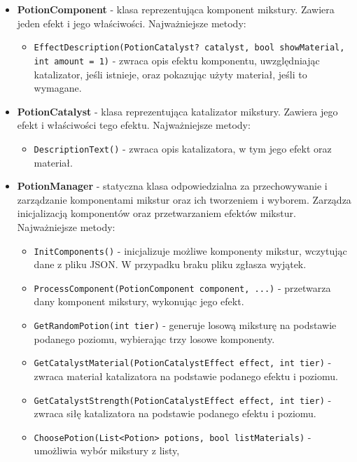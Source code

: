\begin{itemize}
        \item \textbf{PotionComponent} - klasa reprezentująca komponent mikstury. 
        Zawiera jeden efekt i jego właściwości. Najważniejsze metody:
            \begin{itemize}
                \item \texttt{EffectDescription(PotionCatalyst? catalyst, bool showMaterial, int amount = 1)} - zwraca opis efektu komponentu, 
                uwzględniając katalizator, jeśli istnieje, oraz pokazując użyty materiał, jeśli to wymagane.
            \end{itemize}
        \item \textbf{PotionCatalyst} - klasa reprezentująca katalizator mikstury. 
        Zawiera jego efekt i właściwości tego efektu. Najważniejsze metody:
            \begin{itemize}
                \item \texttt{DescriptionText()} - zwraca opis katalizatora, w tym jego efekt oraz materiał.
            \end{itemize}
        \item \textbf{PotionManager} - statyczna klasa odpowiedzialna za przechowywanie i zarządzanie komponentami mikstur oraz ich tworzeniem i wyborem.
        Zarządza inicjalizacją komponentów oraz przetwarzaniem efektów mikstur. Najważniejsze metody:
            \begin{itemize}
                \item \texttt{InitComponents()} - inicjalizuje możliwe komponenty mikstur, wczytując dane z pliku JSON. 
                W przypadku braku pliku zgłasza wyjątek.
                \item \texttt{ProcessComponent(PotionComponent component, ...)} - przetwarza dany komponent mikstury, 
                wykonując jego efekt.
                \item \texttt{GetRandomPotion(int tier)} - generuje losową miksturę na podstawie podanego poziomu, 
                wybierając trzy losowe komponenty.
                \item \texttt{GetCatalystMaterial(PotionCatalystEffect effect, int tier)} - zwraca materiał katalizatora na podstawie podanego efektu i poziomu.
                \item \texttt{GetCatalystStrength(PotionCatalystEffect effect, int tier)} - zwraca siłę katalizatora na podstawie podanego efektu i poziomu.
                \item \texttt{ChoosePotion(List<Potion> potions, bool listMaterials)} - umożliwia wybór mikstury z listy, 

\end{itemize}
\end{itemize}
